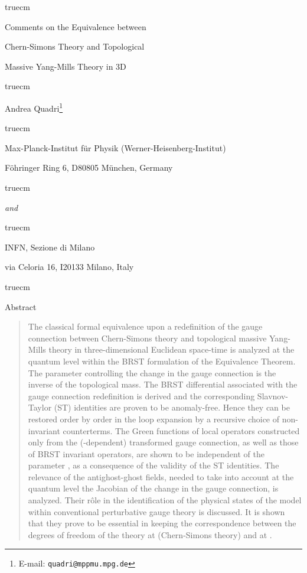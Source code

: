 \documentclass[a4paper,11pt]{article}
\begin{document}

 truecm
\Large
\bf 

\centerline{Comments on the Equivalence between}
\centerline{Chern-Simons Theory and Topological}
\centerline{Massive Yang-Mills Theory in 3D}

\normalsize 
\rm

 truecm

\Large
\centerline{Andrea Quadri\footnote{E-mail: {\tt quadri@mppmu.mpg.de}}}

\normalsize
{} truecm

\centerline{Max-Planck-Institut f\"ur Physik (Werner-Heisenberg-Institut)}
\centerline{F\"ohringer Ring 6, D80805 M\"unchen, Germany}
 truecm

\centerline{{\em and}}

 truecm
\centerline{INFN, Sezione di Milano}
\centerline{via Celoria 16, I20133 Milano, Italy}


 truecm
\bf
\centerline{Abstract}

\rm 

\begin{quotation}
The classical formal 
equivalence upon a redefinition of the gauge connection
between Chern-Simons theory and topological massive Yang-Mills theory
in three-dimensional Euclidean space-time
is analyzed at the quantum level within the BRST formulation of the Equivalence
Theorem. The parameter controlling the change in the gauge connection 
is the inverse \myHighlight{$\lambda$}\coordHE{} of the topological mass.
The BRST differential associated with the gauge connection
redefinition is derived and the corresponding Slavnov-Taylor (ST) 
identities are proven to be anomaly-free.
Hence they can be restored order by order in the loop
expansion by a recursive choice of non-invariant counterterms.
%
The Green functions of local operators constructed only from the 
(\myHighlight{$\lambda$}\coordHE{}-dependent) transformed
gauge connection, as well as those of BRST invariant operators,
are shown to be independent of the parameter \myHighlight{$\lambda$}\coordHE{}, 
as a consequence of the validity of the ST identities.
The relevance of the antighost-ghost
fields, needed to take into account at the quantum level
the Jacobian of the change in the gauge connection,
 is analyzed. Their r\^ole in the identification of
the physical states of the model within conventional perturbative
gauge theory is discussed.
It is shown that they prove to be essential in keeping
the correspondence between the degrees of freedom of the theory
at \coordHE{} (Chern-Simons theory) and at \coordHE{}.
\end{quotation}
\end{document}
